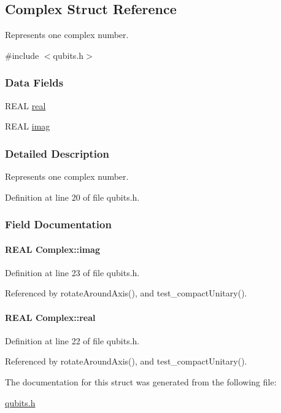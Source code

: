 \hypertarget{structComplex}{
\subsection{Complex Struct Reference}
\label{structComplex}
}


Represents one complex number.  


{\ttfamily \#include $<$qubits.h$>$}\subsubsection*{Data Fields}
\begin{DoxyCompactItemize}
\item 
REAL \hyperlink{structComplex_a479ad939835457595fcca3ca55c06283}{real}
\item 
REAL \hyperlink{structComplex_a1151948284b21c0052f203f23ab931d9}{imag}
\end{DoxyCompactItemize}


\subsubsection{Detailed Description}
Represents one complex number. 

Definition at line 20 of file qubits.h.

\subsubsection{Field Documentation}
\hypertarget{structComplex_a1151948284b21c0052f203f23ab931d9}{
\paragraph[{imag}]{\setlength{\rightskip}{0pt plus 5cm}REAL {\bf Complex::imag}}\hfill}
\label{structComplex_a1151948284b21c0052f203f23ab931d9}


Definition at line 23 of file qubits.h.

Referenced by rotateAroundAxis(), and test\_\-compactUnitary().\hypertarget{structComplex_a479ad939835457595fcca3ca55c06283}{
\paragraph[{real}]{\setlength{\rightskip}{0pt plus 5cm}REAL {\bf Complex::real}}\hfill}
\label{structComplex_a479ad939835457595fcca3ca55c06283}


Definition at line 22 of file qubits.h.

Referenced by rotateAroundAxis(), and test\_\-compactUnitary().

The documentation for this struct was generated from the following file:\begin{DoxyCompactItemize}
\item 
\hyperlink{qubits_8h}{qubits.h}\end{DoxyCompactItemize}
